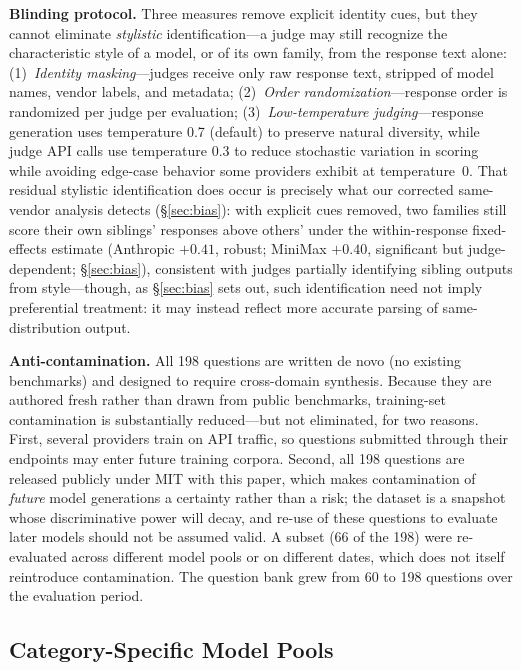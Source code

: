 \documentclass{article}
\begin{document}
\textbf{Blinding protocol.} Three measures remove explicit identity cues, but they cannot eliminate \emph{stylistic} identification---a judge may still recognize the characteristic style of a model, or of its own family, from the response text alone: (1)~\emph{Identity masking}---judges receive only raw response text, stripped of model names, vendor labels, and metadata; (2)~\emph{Order randomization}---response order is randomized per judge per evaluation; (3)~\emph{Low-temperature judging}---response generation uses temperature 0.7 (default) to preserve natural diversity, while judge API calls use temperature 0.3 to reduce stochastic variation in scoring while avoiding edge-case behavior some providers exhibit at temperature~0. That residual stylistic identification does occur is precisely what our corrected same-vendor analysis detects (\S\ref{sec:bias}): with explicit cues removed, two families still score their own siblings' responses above others' under the within-response fixed-effects estimate (Anthropic $+0.41$, robust; MiniMax $+0.40$, significant but judge-dependent; \S\ref{sec:bias}), consistent with judges partially identifying sibling outputs from style---though, as \S\ref{sec:bias} sets out, such identification need not imply preferential treatment: it may instead reflect more accurate parsing of same-distribution output.

\textbf{Anti-contamination.} All 198 questions are written de novo (no existing benchmarks) and designed to require cross-domain synthesis. Because they are authored fresh rather than drawn from public benchmarks, training-set contamination is substantially reduced---but not eliminated, for two reasons. First, several providers train on API traffic, so questions submitted through their endpoints may enter future training corpora. Second, all 198 questions are released publicly under MIT with this paper, which makes contamination of \emph{future} model generations a certainty rather than a risk; the dataset is a snapshot whose discriminative power will decay, and re-use of these questions to evaluate later models should not be assumed valid. A subset (66 of the 198) were re-evaluated across different model pools or on different dates, which does not itself reintroduce contamination. The question bank grew from 60 to 198 questions over the evaluation period.

\subsection{Category-Specific Model Pools}
\end{document}
